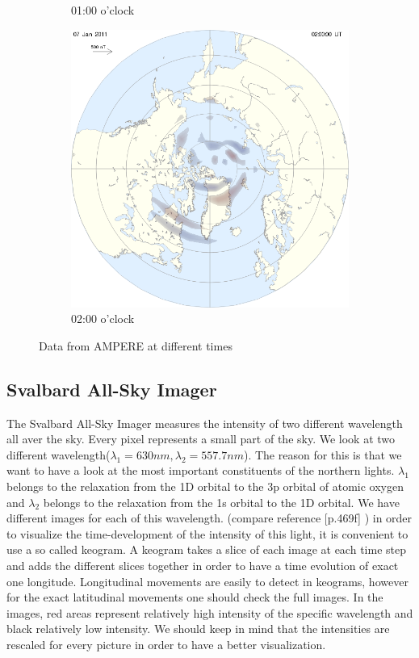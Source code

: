 \documentclass[10pt,a4paper]{article}
\begin{document}
\begin{figure}[h]
\begin{subfigure}{0.3\textwidth}
	\caption{ 01:00 o'clock \label{amp01}}
\end{subfigure}
\begin{subfigure}{0.3\textwidth}
\centering
	\includegraphics[width=\textwidth]{ampere8.png}
	\caption{ 02:00 o'clock \label{amp02}}
\end{subfigure}
\caption{Data from AMPERE at different times}
\end{figure}



\subsection{Svalbard All-Sky Imager \label{0_CHAPTER_SVALBARDIM}}

The Svalbard All-Sky Imager measures the intensity of two different wavelength all aver the sky. Every pixel represents a small part of the sky. We look at two different wavelength($\lambda_1=630 nm, \lambda_2= 557.7 nm$). The reason for this is that we want to have a look at the most important constituents of the northern lights. $\lambda_1$ belongs to the relaxation from the 1D orbital to the 3p orbital of atomic oxygen and $\lambda_2$ belongs to the relaxation from the 1s orbital to the 1D orbital. We have different images for each of this wavelength. (compare reference \cite{Buch2}[p.469f] )
in order to visualize the time-development of the intensity of this light, it is convenient to use a so called keogram. 
A keogram takes a slice of each image at each time  step and adds the different slices together in order to have a time evolution of exact one longitude. Longitudinal movements are easily to detect in keograms, however for the exact latitudinal movements one should check the full images. 
In the images, red areas represent relatively high intensity of the specific wavelength and black relatively low intensity. We should keep in mind that the intensities are rescaled for every picture in order to have a better visualization. 
\end{document}
